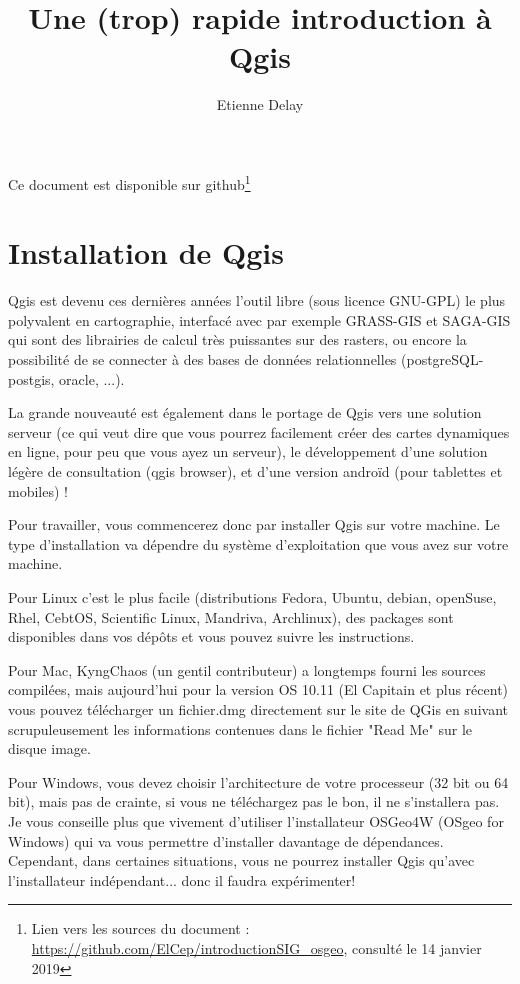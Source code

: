 \documentclass[a4paper, 11pt]{article}
\title{Une (trop) rapide introduction à Qgis}
\author[123]{Etienne Delay}
\affil[1]{1 CIRAD UPR GREEN, F-34398 Montpellier, France}
\affil[2]{GREEN, CIRAD, Univ. Montpellier, Montpellier France}
\affil[3]{Laboratoire GEOLAB UMR 6042 CNRS, Universit\'e de Limoges, FLSH. 39E rue Camille Gu\'erin, 87036 Limoges, France}
\begin{document}
\maketitle
Ce document est disponible sur github\footnote{Lien vers les sources du document : \url{https://github.com/ElCep/introductionSIG_osgeo}, consulté le 14 janvier 2019}
\section{Installation de Qgis}
  Qgis est devenu ces dernières années l'outil libre (sous licence GNU-GPL) le plus polyvalent en cartographie, interfacé avec par exemple GRASS-GIS et SAGA-GIS qui sont des librairies de calcul très puissantes sur des rasters, ou encore la possibilité de se connecter à des bases de données relationnelles (postgreSQL-postgis, oracle, ...).

  La grande nouveauté est également dans le portage de Qgis vers une solution serveur (ce qui veut dire que vous pourrez facilement créer des cartes dynamiques en ligne, pour peu que vous ayez un serveur), le développement d'une solution légère de consultation (qgis browser), et d'une version androïd (pour tablettes et mobiles) !

  Pour travailler, vous commencerez donc par installer Qgis sur votre machine. Le type d'installation va dépendre du système d'exploitation que vous avez sur votre machine.

  Pour Linux c'est le plus facile (distributions Fedora, Ubuntu, debian, openSuse, Rhel, CebtOS, Scientific Linux, Mandriva, Archlinux), des packages sont disponibles dans vos dépôts et vous pouvez suivre les instructions.

  Pour Mac, KyngChaos (un gentil contributeur) a longtemps fourni les sources compilées, mais aujourd'hui pour la version OS 10.11 (El Capitain et plus récent) vous pouvez télécharger un fichier.dmg directement sur le site de QGis en suivant scrupuleusement les informations contenues dans le fichier "Read Me" sur le disque image.

  Pour Windows, vous devez choisir l'architecture de votre processeur (32 bit ou 64 bit), mais pas de crainte, si vous ne téléchargez pas le bon, il ne s'installera pas. Je vous conseille plus que vivement d'utiliser l'installateur OSGeo4W (OSgeo for Windows) qui va vous permettre d'installer davantage de dépendances. Cependant, dans certaines situations, vous ne pourrez installer Qgis qu'avec l'installateur indépendant... donc il faudra expérimenter!
\end{document}
